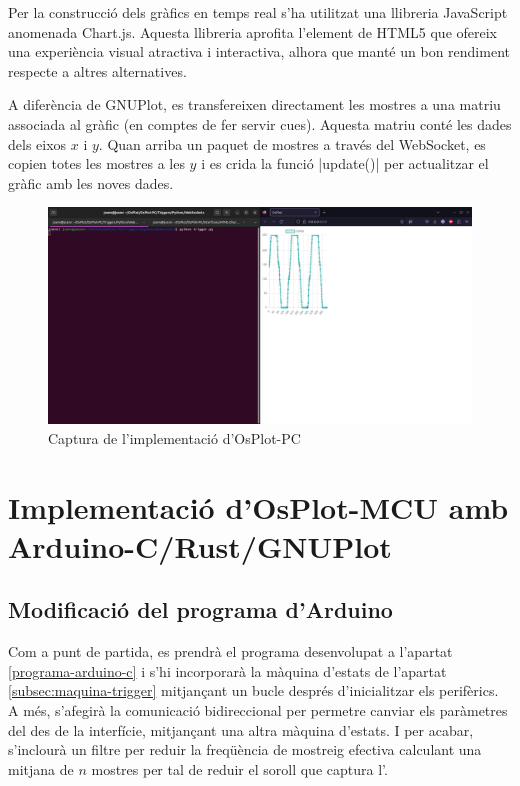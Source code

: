 \documentclass{tfgitic}[2023/07/07]
\begin{document}
Per la construcció dels gràfics en temps real s'ha utilitzat una
llibreria JavaScript anomenada Chart.js. Aquesta llibreria aprofita
l'element  de HTML5 que ofereix una experiència visual
atractiva i interactiva, alhora que manté un bon rendiment respecte
a altres alternatives.

A diferència de GNUPlot, es transfereixen directament les mostres a
una matriu associada al gràfic (en comptes de fer servir
cues). Aquesta matriu conté les dades dels eixos $x$ i $y$. Quan
arriba un paquet de mostres a través del WebSocket, es copien totes
les mostres a les $y$ i es crida la funció \ord|update()| per
actualitzar el gràfic amb les noves dades.

\begin{figure}[h]
  \centering \includegraphics[width=\textwidth]{imgs/OsPlot-PC.png}
  \caption{Captura de l'implementació d'OsPlot-PC}
\end{figure}

\chapter{Implementació d'OsPlot-MCU amb Arduino-C/Rust/GNUPlot}

\section{Modificació del programa d'Arduino}

Com a punt de partida, es prendrà el programa desenvolupat a l'apartat
\ref{programa-arduino-c} i s'hi incorporarà la màquina d'estats de
l'apartat \ref{subsec:maquina-trigger} mitjançant un bucle després
d'inicialitzar els perifèrics. A més, s'afegirà la comunicació
bidireccional per permetre canviar els paràmetres del 
des de la interfície, mitjançant una altra màquina d'estats. I per
acabar, s'inclourà un filtre per reduir la freqüència de mostreig
efectiva calculant una mitjana de $n$ mostres per tal de reduir el
soroll que captura l'.
\end{document}
